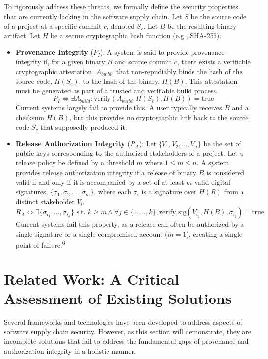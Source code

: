 \documentclass{article}
\begin{document}
To rigorously address these threats, we formally define the security properties that are currently lacking in the software supply chain. Let $S$ be the source code of a project at a specific commit $c$, denoted $S_c$. Let $B$ be the resulting binary artifact. Let $H$ be a secure cryptographic hash function (e.g., SHA-256).

\begin{itemize}
\item \textbf{Provenance Integrity} ($P_I$): A system is said to provide provenance integrity if, for a given binary $B$ and source commit $c$, there exists a verifiable cryptographic attestation, $A_{build}$, that non-repudiably binds the hash of the source code, $H(S_c)$, to the hash of the binary, $H(B)$. This attestation must be generated as part of a trusted and verifiable build process.
$$P_I \iff \exists A_{build} : \text{verify}(A_{build}, H(S_c), H(B)) = \text{true}$$
Current systems largely fail to provide this. A user typically receives $B$ and a checksum $H(B)$, but this provides no cryptographic link back to the source code $S_c$ that supposedly produced it.

\item \textbf{Release Authorization Integrity} ($R_A$): Let $\{V_1, V_2,..., V_n\}$ be the set of public keys corresponding to the authorized stakeholders of a project. Let a release policy be defined by a threshold $m$ where $1 \le m \le n$. A system provides release authorization integrity if a release of binary $B$ is considered valid if and only if it is accompanied by a set of at least $m$ valid digital signatures, $\{\sigma_1, \sigma_2,..., \sigma_m\}$, where each $\sigma_i$ is a signature over $H(B)$ from a distinct stakeholder $V_i$.
$$R_A \iff \exists \{\sigma_{i_1},..., \sigma_{i_k}\} \text{ s.t. } k \ge m \land \forall j \in \{1,..., k\}, \text{verify\_sig}(V_{i_j}, H(B), \sigma_{i_j}) = \text{true}$$
Current systems fail this property, as a release can often be authorized by a single signature or a single compromised account ($m=1$), creating a single point of failure.\textsuperscript{6}
\end{itemize}

\section{Related Work: A Critical Assessment of Existing Solutions}
\label{sec:related-work-a-critical-assessment-of-existing-s}

Several frameworks and technologies have been developed to address aspects of software supply chain security. However, as this section will demonstrate, they are incomplete solutions that fail to address the fundamental gaps of provenance and authorization integrity in a holistic manner.
\end{document}
